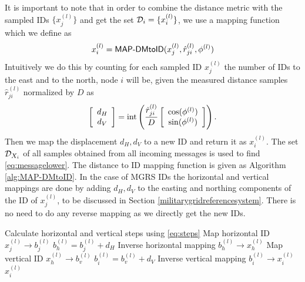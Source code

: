 \documentclass[10pt, final, journal]{IEEEtran}
\begin{document}
It is important to note that in order to combine the distance metric with the sampled IDs $\{x_j^{(l)}\}$ and get the set  ${\cal D}_i=\{x_i^{(l)}\}$, we use a mapping function which we define as
\begin{equation}
x_i^{(l)}={\sf MAP}\text{-}{\sf DMtoID}(x_j^{(l)},\hat{r}_{ji}^{(l)},\phi^{(l)})
\end{equation}
Intuitively we do this by counting for each sampled ID $x_j^{(l)}$ the number of IDs to the east and to the north, node $i$ will be, given the measured distance samples $\hat{r}_{ji}^{(l)}$ normalized by $D$ as
\begin{equation}\label{eq:steps}
\left[\begin{array}{c}
d_H\\
d_V
\end{array}\right]={\rm int}\left(\frac{\hat{r}_{ji}^{(l)}}{D}
\left[\begin{array}{c}
\cos(\phi^{(l)})\\
\sin(\phi^{(l)})
\end{array}\right]\right).
\end{equation}
Then we map the displacement $d_H, d_V$ to a new ID and return it as $x_i^{({l})}$. The set ${\cal D}_{ X_{i}}$ of all samples obtained from all incoming messages is used to find \eqref{eq:messagelower}. The distance to ID mapping function is given as Algorithm \ref{alg:MAP-DMtoID}. In the case of MGRS IDs the horizontal and vertical mappings are done by adding $d_H, d_V$ to the easting and northing components of the ID of $x_j^{({l})}$, to be discussed in Section \ref{militarygridreferencesystem}. There is no need to do any reverse mapping as we directly get the new IDs.

\begin{algorithm}
\caption{${\sf MAP}\text{-}{\sf DMtoID}$}
\begin{algorithmic}[1]
\label{alg:MAP-DMtoID}
\STATE Calculate horizontal and vertical steps using \eqref{eq:steps}
\STATE Map horizontal ID $ x^{(l)}_{j}\rightarrow  b^{(l)}_{j}$
\STATE  $b^{(l)}_{h}=b^{(l)}_{j} + d_H$
\STATE Inverse horizontal mapping $b^{(l)}_{h} \rightarrow x^{(l)}_{h}$
\STATE Map vertical ID $x^{(l)}_{h}\rightarrow b^{(l)}_{v}$
\STATE  $b^{(l)}_{i}=b^{(l)}_{v} + d_V$
\STATE Inverse vertical mapping  $b^{(l)}_{i} \rightarrow x^{(l)}_{i}$
\RETURN ${ x}^{(l)}_{i}$
\end{algorithmic}
\end{algorithm}
\end{document}
